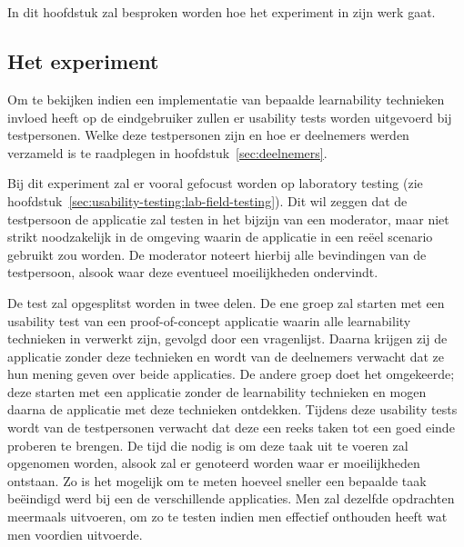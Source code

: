 \chapter{}
\label{ch:methodologie}


In dit hoofdstuk zal besproken worden hoe het experiment in zijn werk gaat. %

\section{Het experiment}
\label{sec:experiment}

Om te bekijken indien een implementatie van bepaalde learnability technieken invloed heeft op de eindgebruiker zullen er usability tests worden uitgevoerd bij testpersonen. Welke deze testpersonen zijn en hoe er deelnemers werden verzameld is te raadplegen in hoofdstuk~\ref{sec:deelnemers}.

Bij dit experiment zal er vooral gefocust worden op laboratory testing (zie hoofdstuk~\ref{sec:usability-testing:lab-field-testing}). Dit wil zeggen dat de testpersoon de applicatie zal testen in het bijzijn van een moderator, maar niet strikt noodzakelijk in de omgeving waarin de applicatie in een reëel scenario gebruikt zou worden. De moderator noteert hierbij alle bevindingen van de testpersoon, alsook waar deze eventueel moeilijkheden ondervindt.

De test zal opgesplitst worden in twee delen. De ene groep zal starten met een usability test van een proof-of-concept applicatie waarin alle learnability technieken in verwerkt zijn, gevolgd door een vragenlijst. Daarna krijgen zij de applicatie zonder deze technieken en wordt van de deelnemers verwacht dat ze hun mening geven over beide applicaties. De andere groep doet het omgekeerde; deze starten met een applicatie zonder de learnability technieken en mogen daarna de applicatie met deze technieken ontdekken. Tijdens deze usability tests wordt van de testpersonen verwacht dat deze een reeks taken tot een goed einde proberen te brengen. De tijd die nodig is om deze taak uit te voeren zal opgenomen worden, alsook zal er genoteerd worden waar er moeilijkheden ontstaan. Zo is het mogelijk om te meten hoeveel sneller een bepaalde taak beëindigd werd bij een de verschillende applicaties. Men zal dezelfde opdrachten meermaals uitvoeren, om zo te testen indien men effectief onthouden heeft wat men voordien uitvoerde.



